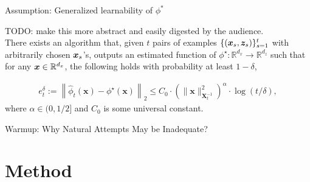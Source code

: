 \documentclass[10pt, xcolor={dvipsnames,x11names},compress]{beamer}
\begin{document}
\begin{frame}{Assumption: Generalized learnability of $\phi^*$}

TODO: make this more abstract and easily digested by the audience.\\

There exists an algorithm that, given $t$ pairs of examples $\{({\bm{x}}_s, {\bm{z}}_s)\}_{s=1}^t$ with  arbitrarily chosen ${\bm{x}}_s$'s,   outputs an estimated function of $\phi^\star: \mathbb{R}^{d_x} \rightarrow \mathbb{R}^{d_z}$ such that for any ${\bm{x}}\in \mathbb{R}^{d_x}$,  the following holds with probability at least $1-\delta$, 

\begin{align}
     e_t^\delta:=\left\|\widehat{\phi}_t(\boldsymbol{x})-\phi^{\star}(\boldsymbol{x})\right\|_2 \leq C_0 \cdot\left(\|\boldsymbol{x}\|_{\boldsymbol{X}_t^{-1}}^2\right)^\alpha \cdot \log (t / \delta), \nonumber
\end{align}
where $\alpha \in (0, 1/2]$ and $C_0$ is some universal constant. 

\end{frame}

\begin{frame}[label=warmup]{Warmup: Why Natural Attempts May be Inadequate?}

\end{frame}

\section{Method}
\end{document}
